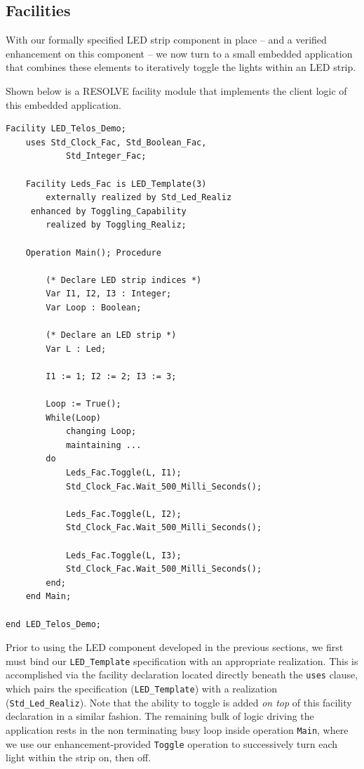 \subsection{Facilities}
\label{sec:facilities}

With our formally specified LED strip component in place -- and a verified enhancement on this component -- we now turn to a small embedded application that combines these elements to iteratively toggle the lights within an LED strip.

Shown below is a RESOLVE facility module that implements the client logic of this embedded application.
\begin{verbatim}
Facility LED_Telos_Demo;
    uses Std_Clock_Fac, Std_Boolean_Fac, 
            Std_Integer_Fac;
    
    Facility Leds_Fac is LED_Template(3)
        externally realized by Std_Led_Realiz
     enhanced by Toggling_Capability
        realized by Toggling_Realiz;
        
    Operation Main(); Procedure
    
        (* Declare LED strip indices *)
        Var I1, I2, I3 : Integer;
        Var Loop : Boolean;
        
        (* Declare an LED strip *)
        Var L : Led;
        
        I1 := 1; I2 := 2; I3 := 3;
        
        Loop := True();
        While(Loop)
            changing Loop;
            maintaining ...
        do
            Leds_Fac.Toggle(L, I1);
            Std_Clock_Fac.Wait_500_Milli_Seconds();
            
            Leds_Fac.Toggle(L, I2);
            Std_Clock_Fac.Wait_500_Milli_Seconds();
            
            Leds_Fac.Toggle(L, I3);
            Std_Clock_Fac.Wait_500_Milli_Seconds();
        end;
    end Main;
    
end LED_Telos_Demo;
\end{verbatim}
Prior to using the LED component developed in the previous sections, we first must bind our \texttt{LED\_Template} specification with an appropriate realization. This is accomplished via the facility declaration located directly beneath the \texttt{uses} clause, which pairs the specification (\texttt{LED\_Template}) with a realization (\texttt{Std\_Led\_Realiz}). Note that the ability to toggle is added \textit{on top} of this facility declaration in a similar fashion. The remaining bulk of logic driving the application rests in the non terminating busy loop inside operation \texttt{Main}, where we use our enhancement-provided \texttt{Toggle} operation to successively turn each light within the strip on, then off.

